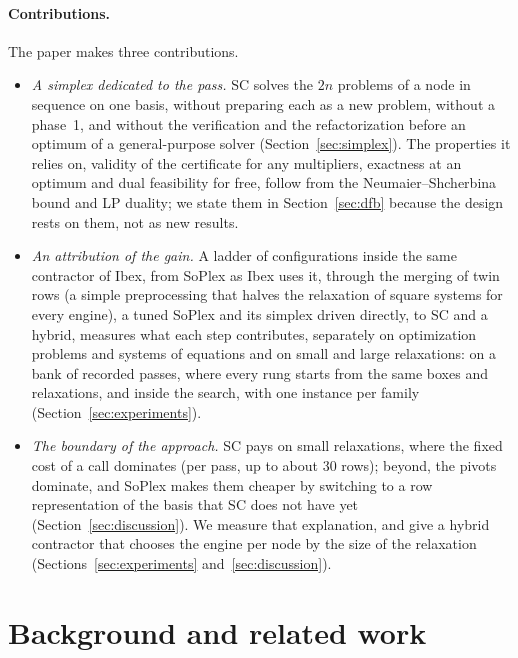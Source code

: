 \documentclass[11pt]{article}
\theoremstyle{definition}
\theoremstyle{remark}
\begin{document}
\paragraph{Contributions.} The paper makes three contributions.
\begin{itemize}
\item \emph{A simplex dedicated to the pass.} SC solves the $2n$ problems of
a node in sequence on one basis, without preparing each as a new problem,
without a phase~1, and without the verification and the refactorization
before an optimum of a general-purpose solver (Section~\ref{sec:simplex}). The properties it relies on, validity of
the certificate for any multipliers, exactness at an optimum and dual
feasibility for free, follow from the Neumaier--Shcherbina bound and LP
duality; we state them in Section~\ref{sec:dfb} because the design rests on
them, not as new results.
\item \emph{An attribution of the gain.} A ladder of configurations inside the
same contractor of Ibex, from SoPlex as Ibex uses it, through the merging of
twin rows (a simple preprocessing that halves the relaxation of square systems
for every engine), a tuned SoPlex and its simplex driven directly, to SC and a
hybrid, measures what each step contributes, separately on optimization problems and systems of equations and
on small and large relaxations: on a bank of recorded passes, where every
rung starts from the same boxes and relaxations, and inside the search, with one instance per family
(Section~\ref{sec:experiments}).
\item \emph{The boundary of the approach.} SC pays on small relaxations, where
the fixed cost of a call dominates (per pass, up to about 30 rows); beyond,
the pivots dominate, and SoPlex makes them cheaper by switching to a row
representation of the basis that SC does not have yet
(Section~\ref{sec:discussion}). We measure that
explanation, and give a hybrid contractor
that chooses the engine per node by the size of the relaxation
(Sections~\ref{sec:experiments} and~\ref{sec:discussion}).
\end{itemize}

\section{Background and related work}\label{sec:background}
\end{document}
